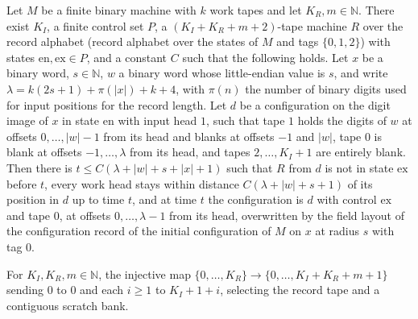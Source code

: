 \begin{lemma}
\label{Complexity.sph_initial_record}
\leanok
{}
Let $M$ be a finite binary machine with $k$ work tapes and let $K_R,m\in\mathbb{N}$. There exist
$K_I$, a finite control set $P$, a $(K_I+K_R+m+2)$-tape machine $R$ over the record alphabet
(record alphabet over the states of $M$ and tags $\{0,1,2\}$) with states $\mathrm{en},\mathrm{ex}\in P$, and a constant $C$ such that the
following holds. Let $x$ be a binary word, $s\in\mathbb{N}$, $w$ a binary word whose little-endian
value is $s$, and write $\lambda=k(2s+1)+\pi(|x|)+k+4$, with $\pi(n)$ the number of binary digits used for input positions for the record length. Let $d$ be a configuration on the
digit image of $x$ in state $\mathrm{en}$ with input head $1$, such that tape $1$ holds the digits
of $w$ at offsets $0,\dots,|w|-1$ from its head and blanks at offsets $-1$ and $|w|$, tape $0$ is
blank at offsets $-1,\dots,\lambda$ from its head, and tapes $2,\dots,K_I+1$ are entirely blank.
Then there is $t\le C(\lambda+|w|+s+|x|+1)$ such that $R$ from $d$ is not in state $\mathrm{ex}$
before $t$, every work head stays within distance $C(\lambda+|w|+s+1)$ of its position in $d$ up to
time $t$, and at time $t$ the configuration is $d$ with control $\mathrm{ex}$ and tape $0$, at
offsets $0,\dots,\lambda-1$ from its head, overwritten by the field layout of the configuration
record of the initial configuration of $M$ on $x$ at radius $s$ with tag $0$.
\end{lemma}

\begin{definition}
\label{Complexity.sphRunnerSel}
\leanok
For $K_I,K_R,m\in\mathbb{N}$, the injective map $\{0,\dots,K_R\}\to\{0,\dots,K_I+K_R+m+1\}$ sending
$0$ to $0$ and each $i\ge1$ to $K_I+1+i$, selecting the record tape and a contiguous scratch bank.
\end{definition}

